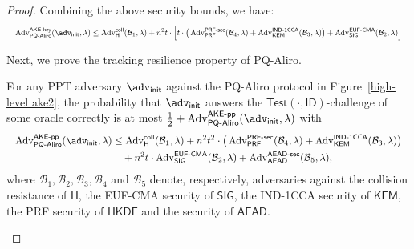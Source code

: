 \documentclass[runningheads]{llncs}
\newcommand{\kem}{\mathsf{KEM}}
\newcommand{\hkdf}{\mathsf{HKDF}}
\begin{document}
\begin{proof}
Combining the above security bounds, we have:
\begin{equation*}
\resizebox{\linewidth}{!}{$\displaystyle
\mathrm{Adv}_{\mathsf{PQ}\text{-}\mathsf{Aliro}}^{\mathsf{AKE}\text{-}\mathsf{key}}(\adv_{\sf init},\lambda)
\leq \operatorname{Adv}_{\mathsf{H}}^{\mathsf{coll}}(\mathcal{B}_{1}, \lambda)
+ n^{2} t \cdot \Big[
t\cdot \big(\operatorname{Adv}_{\mathsf{PRF}}^{\mathsf{PRF}\text{-}\mathsf{sec}}(\mathcal{B}_{4}, \lambda)
+ \operatorname{Adv}_{\kem}^{\mathsf{IND}\text{-}\mathsf{1CCA}}(\mathcal{B}_{3},\lambda)\big)
+ \operatorname{Adv}_{\mathsf{SIG}}^{\mathsf{EUF}\text{-}\mathsf{CMA}}(\mathcal{B}_{2}, \lambda)
\Big]
$}
\end{equation*}

Next, we prove the tracking resilience property of PQ-Aliro.

\begin{lemma}
\label{tracking resilience}
    For any PPT adversary $\adv_{\sf init}$ against the PQ-Aliro protocol in Figure~\ref{high-level ake2}, the probability that $\adv_{\sf init}$ answers the $\mathsf{Test}(\cdot,\mathsf{ID})$-challenge of some oracle correctly is at most $\frac{1}{2} + \mathrm{Adv}_{\mathsf{PQ}\text{-}\mathsf{Aliro}}^{\mathsf{AKE}\text{-}\mathsf{pp}}(\adv_{\sf init},\lambda)$ with
    \begin{equation*}
\resizebox{\linewidth}{!}{$\displaystyle
\begin{aligned}
\mathrm{Adv}_{\mathsf{PQ}\text{-}\mathsf{Aliro}}^{\mathsf{AKE}\text{-}\mathsf{pp}}(\adv_{\sf init},\lambda)
&\leq \operatorname{Adv}_{\mathsf{H}}^{\mathsf{coll}}(\mathcal{B}_{1}, \lambda)
+ n^{2} t^{2}
\cdot \big( \operatorname{Adv}_{\mathsf{PRF}}^{\mathsf{PRF}\text{-}\mathsf{sec}}(\mathcal{B}_{4}, \lambda)
+ \operatorname{Adv}_{\kem}^{\mathsf{IND}\text{-}\mathsf{1CCA}}(\mathcal{B}_{3},\lambda)\big) \\
&\quad + n^{2} t \cdot \operatorname{Adv}_{\mathsf{SIG}}^{\mathsf{EUF}\text{-}\mathsf{CMA}}(\mathcal{B}_{2}, \lambda) + \mathrm{Adv}_{\mathsf{AEAD}}^{\mathsf{AEAD}\text{-}\mathsf{sec}}(\mathcal{B}_{5},\lambda),
\end{aligned}$}
\end{equation*}
    where  $\mathcal{B}_{1}, \mathcal{B}_{2}, \mathcal{B}_{3}, \mathcal{B}_{4}$ and $\mathcal{B}_{5}$ denote, respectively, adversaries against the collision resistance of $\mathsf{H}$, the EUF-CMA security of $\mathsf{SIG}$, the IND-1CCA security of $\kem$, the PRF security of $\hkdf$ and the security of $\mathsf{AEAD}$.
\end{lemma}


\end{proof}
\end{document}
